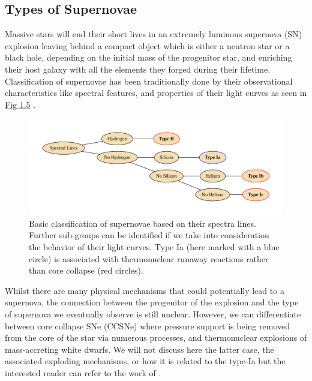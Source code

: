 \documentclass[../../main/thesis_msc.tex]{subfiles}
\begin{document}
			\subsection{Types of Supernovae}
			
				Massive stars will end their short lives in an extremely luminous supernova (SN) explosion leaving behind a compact object which is either a neutron star or a black hole, depending on the initial mass of the progenitor star, and enriching their host galaxy with all the elements they forged during their lifetime. Classification of supernovae has been traditionally done by their observational characteristics like spectral features, and properties of their light curves as seen in \hyperref[fig:SNe_classification]{Fig 1.5} \citep[see][]{Filippenko1997, Turatto2003}. 
				
				\begin{figure}[h]
					\centering
					\includegraphics[width = \textwidth]{../figures/chapter1/SNeClass.pdf}
					\caption{Basic classification of supernovae based on their spectra lines. Further sub-groups can be identified if we take into consideration the behavior of their light curves. Type Ia (here marked with a blue circle) is associated with thermonuclear runaway reactions rather than core collapse (red circles).}
					\label{fig:SNe_classification}
				\end{figure}
				
				Whilst there are many physical mechanisms that could potentially lead to a supernova, the connection between the progenitor of the explosion and the type of supernova we eventually observe is still unclear. However, we can differentiate between core collapse SNe (CCSNe) where pressure support is being removed from the core of the star via numerous processes, and thermonuclear explosions of mass-accreting white dwarfs. We will not discuss here the latter case, the associated exploding mechanisms, or how it is related to the type-Ia but the interested reader can refer to the work of \cite{Hillebrandt2000, Wang2018, SNe_book}.
				
\end{document}
